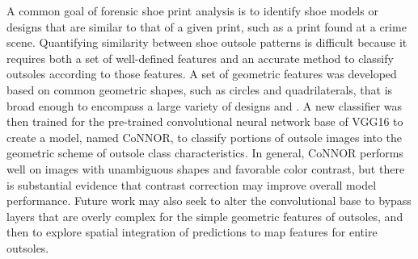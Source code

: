 
A common goal of forensic shoe print analysis is to identify shoe models or designs that are similar to that of a given print, such as a print found at a crime scene. Quantifying similarity between shoe outsole patterns is difficult because it requires both a set of well-defined features and an accurate method to classify outsoles according to those features. A set of geometric features was developed based on common geometric shapes, such as circles and quadrilaterals, that is broad enough to encompass a large variety of designs and . A new classifier was then trained for the pre-trained convolutional neural network base of VGG16 to create a model, named CoNNOR, to classify portions of outsole images into the geometric scheme of outsole class characteristics. In general, CoNNOR performs well on images with unambiguous shapes and favorable color contrast, but there is substantial evidence that contrast correction may improve overall model performance. Future work may also seek to alter the convolutional base to bypass layers that are overly complex for the simple geometric features of outsoles, and then to explore spatial integration of predictions to map features for entire outsoles.
